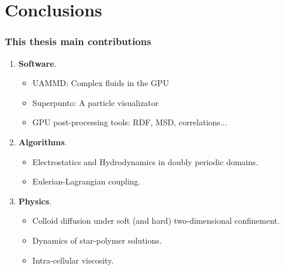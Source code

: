 \documentclass[xcolor=dvipsnames, compress]{beamer}
\begin{document}
\section{Conclusions}
\begin{frame}
  \frametitle{This thesis main contributions}
  \begin{enumerate}
    \Large\color{blue}
  \item \textbf{Software}.
    \begin{itemize}
    \item<+-> UAMMD: Complex fluids in the GPU      
    \item<+-> Superpunto: A particle visualizator
    \item<+-> GPU post-processing tools: RDF, MSD, correlations...
    \end{itemize}
  \item<+-> \textbf{Algorithms}.
    \begin{itemize}
    \item<+-> Electrostatics and Hydrodynamics in doubly periodic domains.
    \item<+-> Eulerian-Lagrangian coupling.
    \end{itemize}
  \item<+-> \textbf{Physics}.
    \begin{itemize}
    \item<+-> Colloid diffusion under soft (and hard) two-dimensional confinement.
    \item<+-> Dynamics of star-polymer solutions.
    \item<+-> Intra-cellular viscosity.
    \end{itemize}
  \end{enumerate}
\end{frame}
\end{document}
